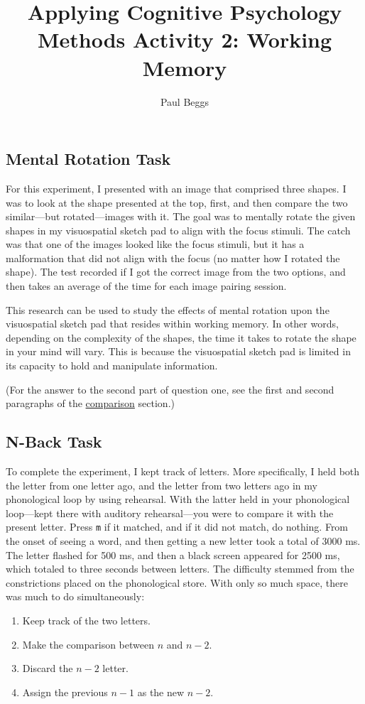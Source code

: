 \documentclass[stu,12pt,floatsintext]{apa7}
\title{Applying Cognitive Psychology Methods Activity 2: Working Memory} %
\author{Paul Beggs}
\begin{document}
\maketitle %

\subsection{Mental Rotation Task}

For this experiment, I presented with an image that comprised three shapes. I was to look at the shape presented at the top, first, and then compare the two similar---but rotated---images with it. The goal was to mentally rotate the given shapes in my visuospatial sketch pad to align with the focus stimuli. The catch was that one of the images looked like the focus stimuli, but it has a malformation that did not align with the focus (no matter how I rotated the shape). The test recorded if I got the correct image from the two options, and then takes an average of the time for each image pairing session.

This research can be used to study the effects of mental rotation upon the visuospatial sketch pad that resides within working memory. In other words, depending on the complexity of the shapes, the time it takes to rotate the shape in your mind will vary. This is because the visuospatial sketch pad is limited in its capacity to hold and manipulate information.

(For the answer to the second part of question one, see the first and second paragraphs of the \hyperlink{comparison}{comparison} section.)



\subsection{N-Back Task}

To complete the experiment, I kept track of letters. More specifically, I held both the letter from one letter ago, and the letter from two letters ago in my phonological loop by using rehearsal. With the latter held in your phonological loop---kept there with auditory rehearsal---you were to compare it with the present letter. Press \texttt{m} if it matched, and if it did not match, do nothing. From the onset of seeing a word, and then getting a new letter took a total of 3000 ms. The letter flashed for 500 ms, and then a black screen appeared for 2500 ms, which totaled to three seconds between letters. The difficulty stemmed from the constrictions placed on the phonological store. With only so much space, there was much to do simultaneously:
\begin{enumerate}
    \item Keep track of the two letters.
    \item Make the comparison between \(n\) and \(n - 2\).
    \item Discard the \(n - 2\) letter.
    \item Assign the previous \(n - 1\) as the new \(n - 2\).
\end{enumerate}
\end{document}
